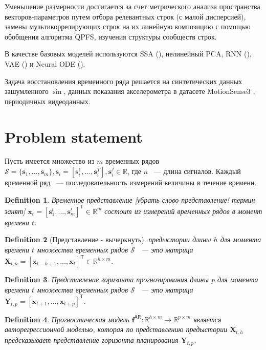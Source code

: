 \documentclass[12pt, twoside]{article}
\newtheorem{definition}{Definition}
\begin{document}

Уменьшение размерности достигается за счет метрического анализа пространства векторов-параметров путем отбора релевантных строк (с малой дисперсией), замены мультикоррелирующих строк на их линейную композицию с помощью обобщения алгоритма QPFS, изучения структуры сообществ строк.

В качестве базовых моделей используются SSA (\citep{golyandina2001analysis}), нелинейный PCA, RNN (\citep{bronstein2021geometric}), VAE (\citep{kingma2019introduction}) и Neural ODE (\citep{chen2018neural}).

Задача восстановления временного ряда решается на синтетических данных зашумленного $\sin$, данных показания акселерометра в датасете MotionSense3 \citep{malekzadeh2018protecting}, периодичных видеоданных. 

\section{Problem statement}
Пусть имеется множество из $m$ временных рядов $\mathcal{S}=\{\mathbf{s}_1, \dots, \mathbf{s}_{m}\}, \mathbf{s}_i = [\mathbf{s}_i^1, \dots, \mathbf{s}_i^T], \mathbf{s}_i^j \in \mathbb{R}$, где $n$ ~--- длина сигналов. Каждый временной ряд ~--- последовательность измерений величины в течение времени.

\begin{definition}
Временное представление [убрать слово представление! термин занят] $\mathbf{x}_t = [\mathbf{s}_1^t, \dots, \mathbf{s}_m^t]^{\mathsf{T}} \in \mathbb{R}^m$ состоит из измерений временных рядов в момент времени $t$.
\end{definition}


\begin{definition}
[Представление - вычеркнуть] предыстории длины $h$ для момента времени $t$ множества временных рядов $\mathcal{S}$ ~--- это матрица $\mathbf{X}_{t,h} = [\mathbf{x}_{t-h+1}, \dots, \mathbf{x}_{t}]^{\mathsf{T}} \in \mathbb{R}^{h \times m}$.
\end{definition}

\begin{definition}
Представление горизонта прогнозирования длины $p$ для момента времени $t$ множества временных рядов $\mathcal{S}$ ~--- это матрица $\mathbf{Y}_{t, p} = [\mathbf{x}_{t+1}, \dots, \mathbf{x}_{t+p}]^{\mathsf{T}}$.
\end{definition}

\begin{definition}
Прогностическая модель $\mathbf{f}^{\mathsf{AR}}: \mathbb{R}^{h \times m} \to \mathbb{R}^{p \times m}$ является авторегрессионной моделью, которая по представлению предыстории $\mathbf{X}_{t, h}$ предсказывает представление горизонта планирования $\mathbf{Y}_{t, p}$.
\end{definition}
\end{document}
